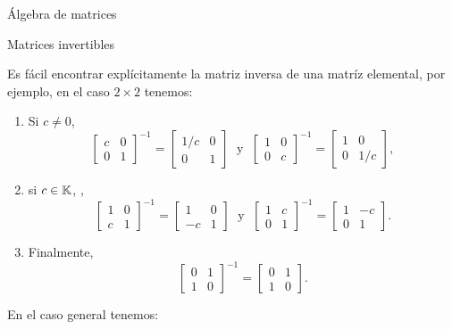 \begin{chapter}{\'Algebra de matrices}
\begin{section}{Matrices invertibles}
            
            \begin{ejemplo*}
                Es fácil encontrar explícitamente la matriz inversa de una matríz elemental, por ejemplo, en el caso $2 \times 2$ tenemos:
                \begin{enumerate}
                    \item Si $c \not=0$,
                    \begin{equation*}
                    \begin{bmatrix} c& 0\\ 0&1\end{bmatrix}^{-1}=\begin{bmatrix} 1/c& 0\\ 0&1\end{bmatrix}
                    \;\text{ y }\; \begin{bmatrix} 1& 0\\ 0&c\end{bmatrix}^{-1}=\begin{bmatrix} 1& 0\\ 0&1/c\end{bmatrix},
                    \end{equation*}
                    \item si  $c \in \mathbb K$, ,
                    \begin{equation*}
                    \begin{bmatrix} 1& 0\\ c&1\end{bmatrix}^{-1}=\begin{bmatrix} 1& 0\\ -c&1\end{bmatrix}
                    \;\text{ y }\; \begin{bmatrix} 1& c\\ 0&1\end{bmatrix}^{-1}=\begin{bmatrix} 1& -c\\ 0&1\end{bmatrix}.
                    \end{equation*}
                    \item Finalmente, 
                    \begin{equation*}
                    \begin{bmatrix} 0& 1\\ 1&0\end{bmatrix} ^{-1}=     \begin{bmatrix} 0& 1\\ 1&0\end{bmatrix}.
                    \end{equation*}
                \end{enumerate}
            En  el caso general tenemos:
            

\end{ejemplo*}
\end{section}
\end{chapter}
